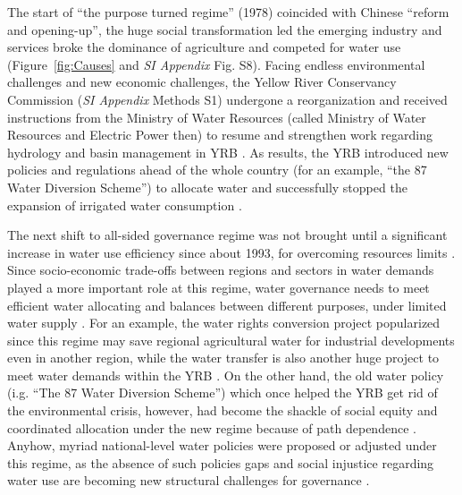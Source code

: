 \documentclass[9pt, twocolumn, twoside, lineno]{pnas-new}
\begin{document}
The start of ``the purpose turned regime'' (1978) coincided with Chinese ``reform and opening-up'', the huge social transformation led the emerging industry and services broke the dominance of agriculture and competed for water use (Figure~\ref{fig:Causes} and \textit{SI Appendix} Fig. S8). 
Facing endless environmental challenges and new economic challenges, the Yellow River Conservancy Commission (\textit{SI Appendix} Methods S1) undergone a reorganization and received instructions from the Ministry of Water Resources (called Ministry of Water Resources and Electric Power then) to resume and strengthen work regarding hydrology and basin management in YRB 
\cite{yellowriverarchivesOrganizationalHistoryYellow2004}.
As results, the YRB introduced new policies and regulations ahead of the whole country (for an example, ``the 87 Water Diversion Scheme'') to allocate water and successfully stopped the expansion of irrigated water consumption 
\cite{wang2018}.

The next shift to all-sided governance regime was not brought until a significant increase in water use efficiency since about 1993, for overcoming resources limits  
\cite{liuWaterconservancyprojects2013}. 
Since socio-economic trade-offs between regions and sectors in water demands played a more important role at this regime, water governance needs to meet efficient water allocating and balances between different purposes, under limited water supply 
\cite{dalin2015a}.
For an example, the water rights conversion project popularized since this regime may save regional agricultural water for industrial developments even in another region, while the water transfer is also another huge project to meet water demands within the YRB
\cite{barnett2015,yunpeng2010}.
On the other hand, the old water policy (i.g. ``The 87 Water Diversion Scheme'') which once helped the YRB get rid of the environmental crisis, however, had become the shackle of social equity and coordinated allocation under the new regime because of path dependence 
\cite{wang2018}.
Anyhow, myriad national-level water policies were proposed or adjusted under this regime, as the absence of such policies gaps and social injustice regarding water use are becoming new structural challenges for governance
\cite{konar2019}.
\end{document}
